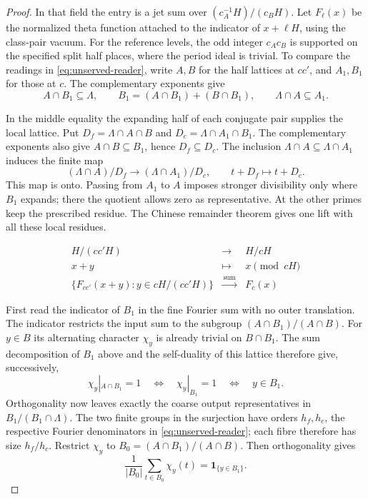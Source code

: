 \begin{proof}
In that field the entry is a jet sum over
\((c_A^{-1}H)/(c_B H)\).
Let \(F_\ell(x)\) be the normalized theta function
attached to the indicator of \(x+\ell H\), using
the class-pair vacuum. For the reference levels, the
odd integer \(c_Ac_B\) is supported on the specified
split half places, where the period ideal is trivial.
To compare the readings in \eqref{eq:unserved-reader}, write
\(A,B\) for the half lattices at \(cc'\), and \(A_1,B_1\)
for those at \(c\). The complementary exponents give
\[
 A\cap B_1\subseteq\Lambda,\qquad
 B_1=(A\cap B_1)+(B\cap B_1),\qquad
 \Lambda\cap A\subseteq A_1 .
\]

In the middle equality the expanding half of each conjugate pair
supplies the local lattice. Put \(D_f=\Lambda\cap A\cap B\)
and \(D_c=\Lambda\cap A_1\cap B_1\). The complementary exponents
also give \(A\cap B\subseteq B_1\), hence \(D_f\subseteq D_c\).
The inclusion \(\Lambda\cap A\subseteq\Lambda\cap A_1\) induces the finite map
\[
 (\Lambda\cap A)/D_f\longrightarrow (\Lambda\cap A_1)/D_c,
 \qquad t+D_f\longmapsto t+D_c .
\]
This map is onto. Passing from \(A_1\) to \(A\) imposes stronger
divisibility only where \(B_1\) expands; there the quotient allows
zero as representative. At the other primes keep the prescribed
residue. The Chinese remainder theorem gives one lift with all
these local residues.

\begin{construction}
\[
 \begin{array}{ccc}
 H/(cc'H)&\longrightarrow&H/cH\\
 x+y&\longmapsto&x \pmod{cH}\\[2pt]
 \{F_{cc'}(x+y):y\in cH/(cc'H)\}&\xrightarrow{\ \mathrm{sum}\ }&F_c(x)
 \end{array}
\]
\caption{Coarsening the Fourier readings in \eqref{eq:selected-kernel-regroup}. The lower arrow sums the fine readings in a single fibre of the upper quotient map.}\label{fig:fine-coarse-fourier}
\end{construction}

First read the indicator of \(B_1\) in the fine Fourier sum
with no outer translation. The indicator restricts the input
sum to the subgroup \((A\cap B_1)/(A\cap B)\).
For \(y\in B\) its alternating character \(\chi_y\) is already
trivial on \(B\cap B_1\). The sum decomposition of \(B_1\) above
and the self-duality of this lattice therefore give, successively,
\[
 \chi_y|_{A\cap B_1}=1
 \quad\Longleftrightarrow\quad \chi_y|_{B_1}=1
 \quad\Longleftrightarrow\quad y\in B_1 .
\] Orthogonality now leaves exactly the
coarse output representatives in \(B_1/(B_1\cap\Lambda)\).
The two finite groups in the surjection have orders \(h_f,h_c\),
the respective Fourier denominators in \eqref{eq:unserved-reader};
each fibre therefore has size \(h_f/h_c\).
Restrict \(\chi_y\) to
\(B_0=(A\cap B_1)/(A\cap B)\). Then
orthogonality gives
\[
 \frac{1}{|B_0|}\sum_{t\in B_0}\chi_y(t)=\mathbf1_{\{y\in B_1\}} .
\]


\end{proof}
